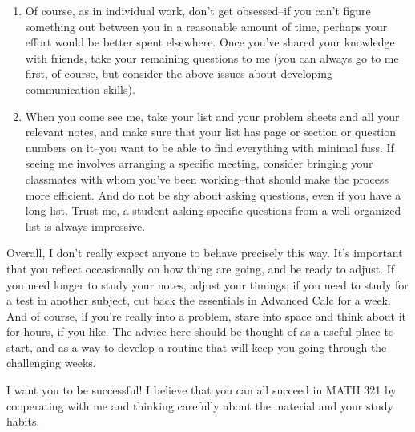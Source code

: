 \documentclass[12pt]{article}
\begin{document}
\begin{enumerate}
\begin{enumerate}
\begin{enumerate}
		\item Of course, as in individual work, don't get obsessed--if you can't figure something out between you in a reasonable amount of time, perhaps your effort would be better spent elsewhere. Once you've shared your knowledge with friends, take your remaining questions to me (you can always go to me first, of course, but consider the above issues about developing communication skills).
		\item When you come see me, take your list and your problem sheets and all your relevant notes, and make sure that your list has page or section or question numbers on it--you want to be able to find everything with minimal fuss. If seeing me involves arranging a specific meeting, consider bringing your classmates with whom you've been working--that should make the process more efficient. And do not be shy about asking questions, even if you have a long list. Trust me, a student asking specific questions from a well-organized list is always impressive.
		\end{enumerate}
	\end{enumerate}
\end{enumerate}
 
Overall, I don't really expect anyone to behave precisely this way. It's important that you reflect occasionally on how thing are going, and be ready to adjust. If you need longer to study your notes, adjust your timings; if you need to study for a test in another subject, cut back the essentials in Advanced Calc for a week. And of course, if you're really into a problem, stare into space and think about it for hours, if you like. The advice here should be thought of as a useful place to start, and as a way to develop a routine that will keep you going through the challenging weeks.

I want you to be successful! I believe that you can all succeed in MATH 321 by cooperating with me and thinking carefully about the material and your study habits.
\end{document}
